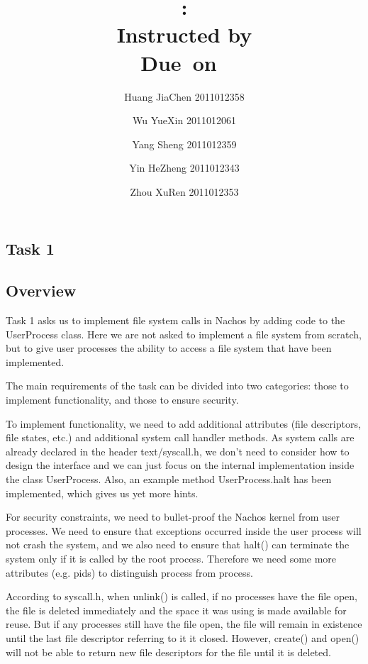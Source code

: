\documentclass{article}
\title{\textmd{\bf \Class: \Title}\\{\large Instructed by \textit{\ClassInstructor}}\\\normalsize\vspace{0.1in}\small{Due\ on\ \DueDate}}
\date{}
\author{%
  Huang JiaChen 2011012358 \and
  Wu YueXin 2011012061 \and
  Yang Sheng 2011012359 \and
  Yin HeZheng 2011012343 \and
  Zhou XuRen 2011012353}
\begin{document}
  \begin{spacing}{1.1}
    \maketitle \thispagestyle{empty}

\section{Task 1}
\subsection{Overview}
Task 1 asks us to implement file system calls  in Nachos by adding code to the \textsf{UserProcess} class. Here we are not asked to implement a file system from scratch, but to give user processes the ability to access a file system that have been implemented.

The main requirements of the task can be divided into two categories: those to implement functionality, and those to ensure security.

To implement functionality, we need to add additional attributes (file descriptors, file states, etc.) and additional system call handler methods. As system calls are already declared in the header \textsf{text/syscall.h}, we don't need to consider how to design the interface and we can just focus on the internal implementation inside the class \textsf{UserProcess}. Also, an example method \textsf{UserProcess.halt} has been implemented, which gives us yet more hints.

For security constraints, we need to bullet-proof the Nachos kernel from user processes. We need to ensure that exceptions occurred inside the user process will not crash the system, and we also need to ensure that \textsf{halt()} can terminate the system only if it is called by the root process. Therefore we need some more attributes (e.g. pids) to distinguish process from process.

According to \textsf{syscall.h}, when \textsf{unlink}() is called,  if no processes have the file open, the file is deleted immediately and the space it was using is made available for reuse. But if any processes still have the file open, the file will remain in existence until the last file descriptor referring to it it closed. However, \textsf{create}() and \textsf{open}() will not be able to return new file descriptors for the file until it is deleted.


\end{spacing}
\end{document}
